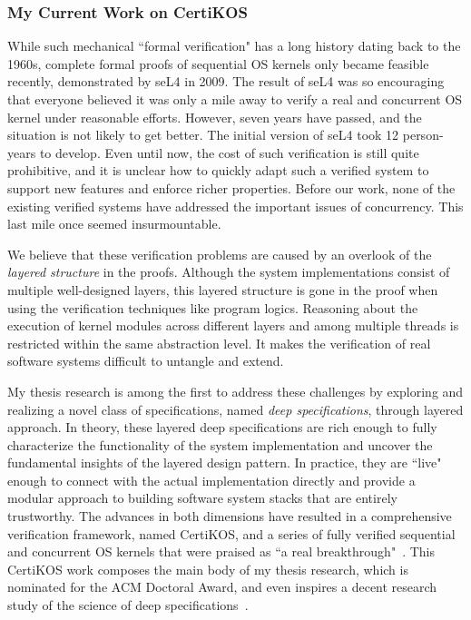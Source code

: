 \documentclass[a4paper, 10pt]{article}
\begin{document}
\begin{small}

\subsubsection*{\large My Current Work on CertiKOS}

While such mechanical ``formal verification" has a long history dating back to the 1960s, 
complete formal proofs of sequential OS kernels only became feasible recently, demonstrated by
seL4 in 2009. The result of seL4 was so encouraging that everyone
believed it was only a mile away to verify a real and concurrent OS kernel under reasonable efforts. However, seven years have passed,
and the situation is not likely to get better. 
The initial version of seL4 took 12 person-years to develop.
Even until now, the cost of such verification is still quite prohibitive,
 and it is unclear how to quickly adapt such a verified system to support new features and enforce richer properties. 
Before our work, none of the existing verified systems have addressed the important
issues of concurrency.
This last mile once seemed insurmountable.

 
We believe that these verification problems
are caused by an overlook of the \emph{layered structure} in the proofs.
Although the system implementations consist of multiple
well-designed layers, this layered structure
is gone in the proof when using the verification techniques like  program logics.
Reasoning about the execution of kernel modules across different layers and among multiple threads is restricted within 
the same abstraction level. It makes the verification
of real software systems  difficult to untangle
and extend.

My thesis research is among the first to address these challenges
by exploring and realizing a novel class of specifications, named \emph{deep specifications}, through layered approach.
In theory, these layered deep specifications are rich
enough to fully characterize the functionality of the system implementation
and
uncover the fundamental
insights of the  layered design pattern. In practice, they are ``live" enough to  connect   with the actual  implementation directly and provide a modular approach to building
 software system stacks that are entirely trustworthy.
The advances in both dimensions have resulted in a comprehensive
verification framework, named CertiKOS, and
a series of fully verified sequential and concurrent OS kernels that were praised as ``a real breakthrough"~\cite{news, dnews}.
This CertiKOS work composes the main body of my thesis research, which is nominated for the ACM Doctoral Award,
and even inspires a decent research study of the science of deep specifications~\cite{deepspec}.



\end{small}
\end{document}
